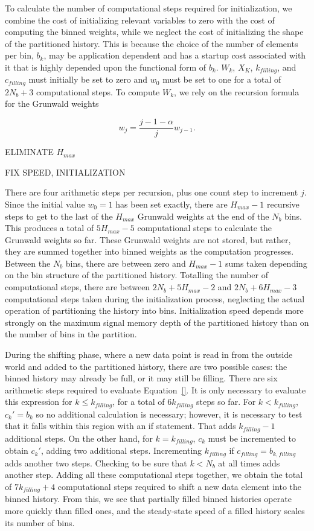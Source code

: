 To calculate the number of computational steps required for initialization, we combine the cost of initializing relevant variables to zero with the cost of computing the binned weights, while we neglect the cost of initializing the shape of the partitioned history. This is because the choice of the number of elements per bin, $b_k$, may be application dependent and has a startup cost associated with it that is highly depended upon the functional form of $b_k$. $W_k$, $X_K$, $k_{filling}$, and $c_{filling}$ must initially be set to zero and $w_0$ must be set to one for a total of $2N_b+3$ computational steps. To compute $W_k$, we rely on the recursion formula for the Grunwald weights

\begin{equation}
w_j = \frac{j-1-\alpha}{j}w_{j-1}.
\label{eqn:GrunwaldRecursion}
\end{equation}

ELIMINATE $H_{max}$

FIX SPEED, INITIALIZATION

\noindent There are four arithmetic steps per recursion, plus one count step to increment $j$. Since the initial value $w_0=1$ has been set exactly, there are $H_{max}-1$ recursive steps to get to the last of the $H_{max}$ Grunwald weights at the end of the $N_b$ bins. This produces a total of $5H_{max}-5$ computational steps to calculate the Grunwald weights so far. These Grunwald weights are not stored, but rather, they are summed together into binned weights as the computation progresses. Between the $N_b$ bins, there are between zero and $H_{max}-1$ sums taken depending on the bin structure of the partitioned history. Totalling the number of computational steps, there are between $2N_b+5H_{max}-2$ and $2N_b+6H_{max}-3$ computational steps taken during the initialization process, neglecting the actual operation of partitioning the history into bins. Initialization speed depends more strongly on the maximum signal memory depth of the partitioned history than on the number of bins in the partition. 

During the shifting phase, where a new data point is read in from the outside world and added to the partitioned history, there are two possible cases: the binned history may already be full, or it may still be filling. There are six arithmetic steps required to evaluate Equation~\ref{}. It is only necessary to evaluate this expression for $k\le k_{filling}$, for a total of $6k_{filling}$ steps so far. For $k<k_{filling}$, $c_k'=b_k$ so no additional calculation is necessary; however, it is necessary to test that it falls within this region with an if statement. That adds $k_{filling}-1$ additional steps. On the other hand, for $k=k_{filling}$, $c_k$ must be incremented to obtain $c_k'$, adding two additional steps. Incrementing $k_{filling}$ if $c_{filling}=b_{k,{filling}}$ adds another two steps. Checking to be sure that $k<N_b$ at all times adds another step. Adding all these computational steps together, we obtain the total of $7k_{filling}+4$ computational steps required to shift a new data element into the binned history. From this, we see that partially filled binned histories operate more quickly than filled ones, and the steady-state speed of a filled history scales its number of bins.

